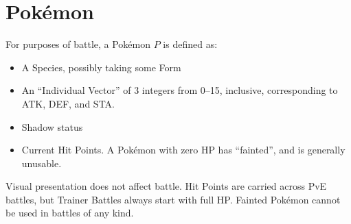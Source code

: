 \chapter{Pokémon}
For purposes of battle, a Pokémon $P$ is defined as:
\begin{itemize}
\item A Species, possibly taking some Form
\item An ``Individual Vector'' of 3 integers from 0--15, inclusive, corresponding to ATK, DEF, and STA.
\item Shadow status
\item Current Hit Points. A Pokémon with zero HP has ``fainted'', and is generally unusable.
\end{itemize}
Visual presentation does not affect battle.
Hit Points are carried across PvE battles, but Trainer Battles always start
 with full HP.
Fainted Pokémon cannot be used in battles of any kind.
